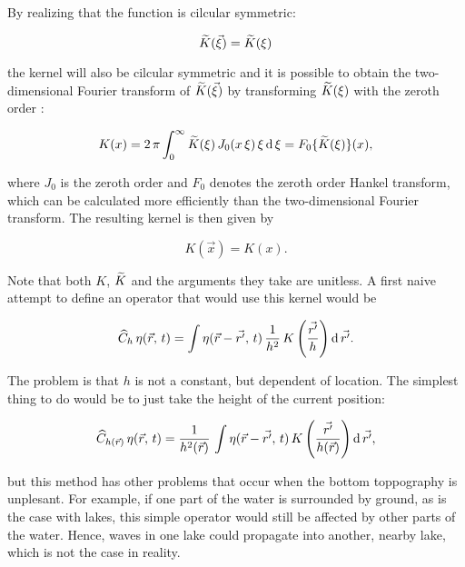 By realizing that the function is cilcular symmetric:

\begin{equation} \label{eq:transkernelsymmetry}
\widetilde{K}(\vec{\xi}) = \widetilde{K}(\xi)
\end{equation}

the kernel will also be cilcular symmetric and it is possible to obtain the two-dimensional Fourier transform of $\widetilde{K}(\vec{\xi})$ by transforming $\widetilde{K}(\xi)$ with the zeroth order :

\begin{equation} \label{eq:kernelhankel}
K(x) = 2\,\pi\int_0^\infty \widetilde{K}(\xi)\,J_0(
x\,\xi)\,\xi\operatorname{d}\xi = F_0\{\widetilde{K}(\xi)\}(x),
\end{equation}

where $J_0$ is the zeroth order  and $F_0$ denotes the zeroth order Hankel transform, which can be calculated more efficiently than the two-dimensional Fourier transform. The resulting kernel is then given by

\begin{equation} \label{eq:kernelsymmetry}
K(\vec{x}) = K(x).
\end{equation}

Note that both $K$, $\widetilde{K}$ and the arguments they take are unitless. A first naive attempt to define an operator that would use this kernel would be

\begin{equation} \label{eq:opcnaivehunknown}
\widehat{C}_h\,\eta(\vec{r},\,t) = \int \eta(\vec{r}-\vec{r'},\,t)\,\frac{1}{h^2}\,K\left(\frac{\vec{r'}}{h}\right) \operatorname{d}\vec{r'}.
\end{equation}

The problem is that $h$ is not a constant, but dependent of location. The simplest thing to do would be to just take the height of the current position:

\begin{equation} \label{eq:opcnaivehlocal}
\widehat{C}_{h(\vec{r})}\,\eta(\vec{r},\,t) = \frac{1}{h^2(\vec{r})}\,\int \eta(\vec{r}-\vec{r'},\,t)\,K\left(\frac{\vec{r'}}{h(\vec{r})}\right) \operatorname{d}\vec{r'},
\end{equation}

but this method has other problems that occur when the bottom toppography is unplesant. For example, if one part of the water is surrounded by ground, as is the case with lakes, this simple operator would still be affected by other parts of the water. Hence, waves in one lake could propagate into another, nearby lake, which is not the case in reality.

